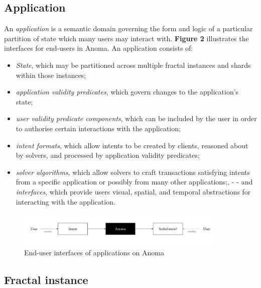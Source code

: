 \documentclass[
    9pt,            %
    commun,        %
    affiltop,       %
]{art}
\begin{document}
\subsection{Application}\label{application}

An \emph{application} is a semantic domain governing the form and logic
of a particular partition of state which many users may interact with.
\textbf{Figure 2} illustrates the interfaces for end-users in Anoma. An
application consists of:

\begin{itemize}
\item
  \emph{State}, which may be partitioned across multiple fractal
  instances and shards within those instances;
\item
  \emph{application validity predicates}, which govern changes to the
  application's state;
\item
  \emph{user validity predicate components}, which can be included by
  the user in order to authorise certain interactions with the
  application;
\item
  \emph{intent formats}, which allow intents to be created by clients,
  reasoned about by solvers, and processed by application validity
  predicates;
\item
  \emph{solver algorithms}, which allow solvers to craft transactions
  satisfying intents from a specific application or possibly from many
  other applications;, - - and \emph{interfaces}, which provide users
  visual, spatial, and temporal abstractions for interacting with the
  application.
\end{itemize}

\begin{figure}[!htb]
\includegraphics[width=0.9\textwidth,keepaspectratio]{figs/user-applications}
\caption{End-user interfaces of applications on Anoma}
\end{figure}

\subsection{Fractal instance}\label{fractal-instance}
\end{document}
